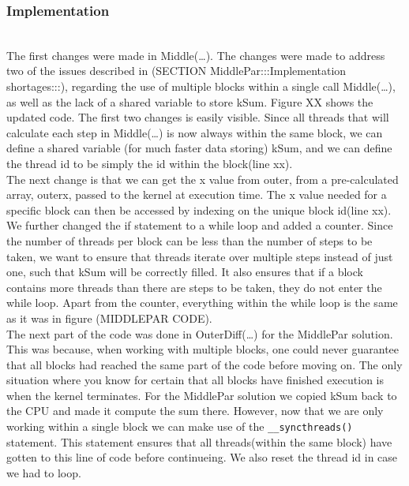 \subsubsection{Implementation} \hfill \\

The first changes were made in Middle(…). The changes were made to address two of the issues described in (SECTION MiddlePar:::Implementation shortages:::), regarding the use of multiple blocks within a single call Middle(…), as well as the lack of a shared variable to store kSum. Figure XX shows the updated code. The first two changes is easily  visible. Since all threads that will calculate each step in Middle(…) is now always within the same block, we can define a shared variable (for much faster data storing) kSum, and we can define the thread id to be simply the id within the block(line xx).\\

The next change is that we can get the x value from outer, from a pre-calculated array, outerx, passed to the kernel at execution time. The x value needed for a specific block can then be accessed by indexing on the unique block id(line xx).\\

We further changed the if statement to a while loop and added a counter. Since the number of threads per block can be less than the number of steps to be taken, we want to ensure that threads iterate over multiple steps instead of just one, such that kSum will be correctly filled. It also ensures that if a block contains more threads than there are steps to be taken, they do not enter the while loop. Apart from the counter, everything within the while loop is the same as it was in figure (MIDDLEPAR CODE).\\

The next part of the code was done in OuterDiff(…) for the MiddlePar solution. This was because, when working with multiple blocks, one could never guarantee that all blocks had reached the same part of the code before moving on. The only situation where you know for certain that all blocks have finished execution is when the kernel terminates. For the MiddlePar solution we copied kSum back to the CPU and made it compute the sum there. However, now that we are only working within a single block we can make use of the \texttt{__syncthreads()} statement. This statement ensures that all threads(within the same block) have gotten to this line of code before continueing. We also reset the thread id in case we had to loop. \\

